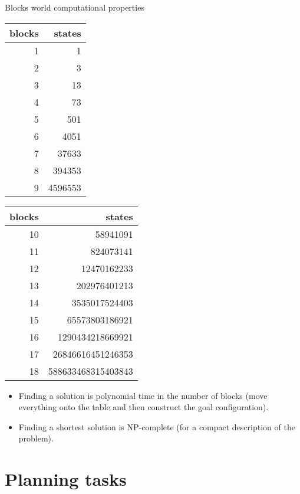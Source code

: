 \documentclass{gkibeamer}
\begin{document}
\begin{frame}{Blocks world computational properties}
  \begin{small}
    \begin{center}
      \begin{tabular}{rr}
        blocks & states \\ \hline
        1 & 1 \\
        2 & 3 \\
        3 & 13 \\
        4 & 73 \\
        5 & 501 \\
        6 & 4051 \\
        7 & 37633 \\
        8 & 394353 \\
        9 & 4596553
      \end{tabular}\qquad
      \begin{tabular}{rr}
        blocks & states \\ \hline
        10 & 58941091 \\
        11 & 824073141 \\
        12 & 12470162233 \\
        13 & 202976401213 \\
        14 & 3535017524403 \\
        15 & 65573803186921 \\
        16 & 1290434218669921 \\
        17 & 26846616451246353 \\
        18 & 588633468315403843
      \end{tabular}
    \end{center}
  \end{small}

  \begin{itemize}
  \item \alert{Finding a solution} is \alert{polynomial time} in the
    number of blocks (move everything onto the table and then
    construct the goal configuration).
  \item Finding a \alert{shortest solution} is \alert{NP-complete}
    (for a compact description of the problem).
  \end{itemize}
\end{frame}

\section{Planning tasks}
\end{document}

